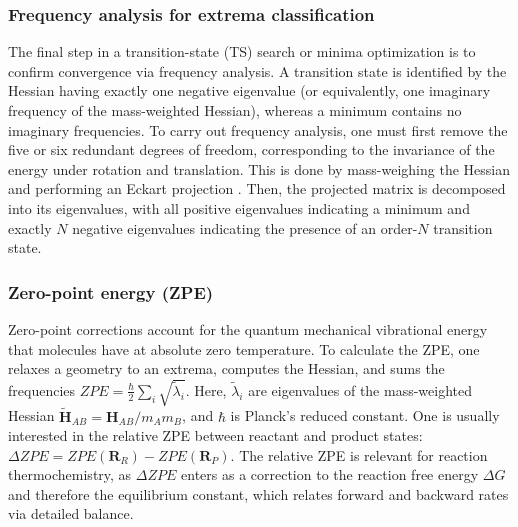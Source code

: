 \documentclass[pdflatex,sn-mathphys-num]{sn-jnl}%
\theoremstyle{thmstyleone}%
\theoremstyle{thmstyletwo}%
\theoremstyle{thmstylethree}%
\begin{document}
\begin{appendices}
\subsubsection{Frequency analysis for extrema classification}
The final step in a transition-state (TS) search or minima optimization is to confirm convergence via frequency analysis. A transition state is identified by the Hessian having exactly one negative eigenvalue (or equivalently, one imaginary frequency of the mass-weighted Hessian), whereas a minimum contains no imaginary frequencies. 
To carry out frequency analysis, one must first remove the five or six redundant degrees of freedom, corresponding to the invariance of the energy under rotation and translation. This is done by mass-weighing the Hessian and performing an Eckart projection \citep{louck1976}. Then, the projected matrix is decomposed into its eigenvalues, with all positive eigenvalues indicating a minimum and exactly $N$ negative eigenvalues indicating the presence of an order-$N$ transition state. 

\subsubsection{Zero-point energy (ZPE)}
Zero-point corrections account for the quantum mechanical vibrational energy that molecules have at absolute zero temperature. To calculate the ZPE, one relaxes a geometry to an extrema, computes the Hessian, and sums the frequencies
$
    ZPE = \frac{\hbar}{2} \sum_i \sqrt{\tilde{\lambda}_i} %
$.
Here, $\tilde{\lambda}_i$ are eigenvalues of the mass-weighted Hessian $\mathbf{\tilde{H}}_{AB} = \mathbf{H}_{AB}/m_Am_B$, and $\hbar$ is Planck's reduced constant.
One is usually interested in the relative ZPE between reactant and product states: $\Delta ZPE = ZPE(\mathbf{R}_R) - ZPE(\mathbf{R}_P)$. The relative ZPE is relevant for reaction thermochemistry, as $\Delta ZPE$ enters as a correction to the reaction free energy $\Delta G$ and therefore the equilibrium constant, which relates forward and backward rates via detailed balance.


\end{appendices}
\end{document}

